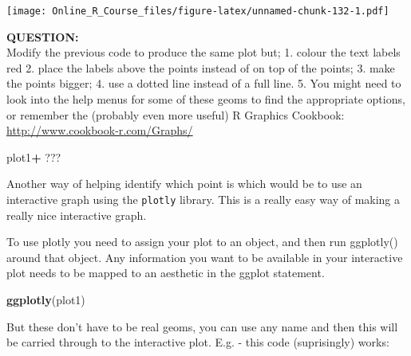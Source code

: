 \documentclass[]{book}
\newenvironment{Shaded}{\begin{snugshade}}{\end{snugshade}}
\newcommand{\DataTypeTok}[1]{\textcolor[rgb]{0.13,0.29,0.53}{#1}}
\newcommand{\KeywordTok}[1]{\textcolor[rgb]{0.13,0.29,0.53}{\textbf{#1}}}
\newcommand{\NormalTok}[1]{#1}
\newcommand{\OperatorTok}[1]{\textcolor[rgb]{0.81,0.36,0.00}{\textbf{#1}}}
\newcommand{\StringTok}[1]{\textcolor[rgb]{0.31,0.60,0.02}{#1}}
\begin{document}
\texttt{[image: Online\_R\_Course\_files/figure-latex/unnamed-chunk-132-1.pdf]}

\textbf{QUESTION: }\\
Modify the previous code to produce the same plot but;
1. colour the text labels red
2. place the labels above the points instead of on top of the points;
3. make the points bigger;
4. use a dotted line instead of a full line.
5. You might need to look into the help menus for some of these geoms to find the appropriate options, or remember the (probably even more useful) R Graphics Cookbook: \url{http://www.cookbook-r.com/Graphs/}

\begin{Shaded}
\begin{Highlighting}[]
\NormalTok{plot1}\OperatorTok{+}
\StringTok{  }\NormalTok{???}
\end{Highlighting}
\end{Shaded}

Another way of helping identify which point is which would be to use an interactive graph using the \texttt{plotly} library. This is a really easy way of making a really nice interactive graph.

To use plotly you need to assign your plot to an object, and then run ggplotly() around that object. Any information you want to be available in your interactive plot needs to be mapped to an aesthetic in the ggplot statement.

\begin{Shaded}
\begin{Highlighting}[]
\KeywordTok{ggplotly}\NormalTok{(plot1)}
\end{Highlighting}
\end{Shaded}

But these don't have to be real geoms, you can use any name and then this will be carried through to the interactive plot. E.g. - this code (suprisingly) works:

\begin{Shaded}
\end{Shaded}
\end{document}
